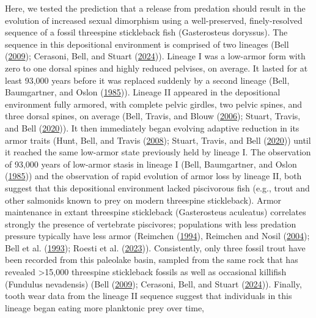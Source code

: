 \documentclass[
  12pt,
]{article}
\begin{document}
Here, we tested the prediction that a release from predation should
result in the evolution of increased sexual dimorphism using a
well-preserved, finely-resolved sequence of a fossil threespine
stickleback fish (Gasterosteus doryssus). The sequence in this
depositional environment is comprised of two lineages (Bell
(\protect\hyperlink{ref-Bell2009}{2009}); Cerasoni, Bell, and Stuart
(\protect\hyperlink{ref-Cerasonietal2024}{2024})). Lineage I was a
low-armor form with zero to one dorsal spines and highly reduced
pelvises, on average. It lasted for at least 93,000 years before it was
replaced suddenly by a second lineage (Bell, Baumgartner, and Oslon
(\protect\hyperlink{ref-Belletal1985}{1985})). Lineage II appeared in
the depositional environment fully armored, with complete pelvic
girdles, two pelvic spines, and three dorsal spines, on average (Bell,
Travis, and Blouw (\protect\hyperlink{ref-Belletal2006}{2006}); Stuart,
Travis, and Bell (\protect\hyperlink{ref-Stuartetal2020}{2020})). It
then immediately began evolving adaptive reduction in its armor traits
(Hunt, Bell, and Travis (\protect\hyperlink{ref-Huntetal2008}{2008});
Stuart, Travis, and Bell (\protect\hyperlink{ref-Stuartetal2020}{2020}))
until it reached the same low-armor state previously held by lineage I.
The observation of 93,000 years of low-armor stasis in lineage I (Bell,
Baumgartner, and Oslon (\protect\hyperlink{ref-Belletal1985}{1985})) and
the observation of rapid evolution of armor loss by lineage II, both
suggest that this depositional environment lacked piscivorous fish
(e.g., trout and other salmonids known to prey on modern threespine
stickleback). Armor maintenance in extant threespine stickleback
(Gasterosteus aculeatus) correlates strongly the presence of vertebrate
piscivores; populations with less predation pressure typically have less
armor (Reimchen (\protect\hyperlink{ref-Reimchen1994}{1994}), Reimchen
and Nosil (\protect\hyperlink{ref-ReimchenandNosil2004}{2004}); Bell et
al. (\protect\hyperlink{ref-Belletal1993}{1993}); Roesti et al.
(\protect\hyperlink{ref-Roestietal2023}{2023})). Consistently, only
three fossil trout have been recorded from this paleolake basin, sampled
from the same rock that has revealed \textgreater15,000 threespine
stickleback fossils as well as occasional killifish (Fundulus
nevadensis) (Bell (\protect\hyperlink{ref-Bell2009}{2009}); Cerasoni,
Bell, and Stuart (\protect\hyperlink{ref-Cerasonietal2024}{2024})).
Finally, tooth wear data from the lineage II sequence suggest that
individuals in this lineage began eating more planktonic prey over time,
\end{document}
